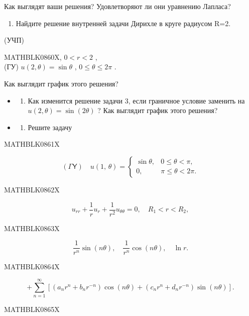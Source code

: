 \documentclass[
  ukrainian,
]{article}
\providecommand{\tightlist}{%
  \setlength{\itemsep}{0pt}\setlength{\parskip}{0pt}}
\begin{document}
Как выглядят ваши решения? Удовлетворяют ли они уравнению Лапласа?

\begin{enumerate}
\def\labelenumi{\arabic{enumi}.}
\setcounter{enumi}{2}
\tightlist
\item
  Найдите решение внутренней задачи Дирихле в круге радиусом R=2.
\end{enumerate}

(УЧП)

MATHBLK0860X, \(0 < r < 2\) ,\\
(ГУ) \(u(2, \theta) = \sin \theta\) , \(0 \le \theta \le 2\pi\) .

Как выглядит график этого решения?

\begin{itemize}
\tightlist
\item
  \begin{enumerate}
  \def\labelenumi{\arabic{enumi}.}
  \setcounter{enumi}{3}
  \tightlist
  \item
    Как изменится решение задачи 3, если граничное условие заменить на
    \(u(2, \theta) = \sin(2\theta)\) ? Как выглядит график этого
    решения?
  \end{enumerate}
\item
  \begin{enumerate}
  \def\labelenumi{\arabic{enumi}.}
  \setcounter{enumi}{4}
  \tightlist
  \item
    Решите задачу
  \end{enumerate}
\end{itemize}

MATHBLK0861X

\[
(\mathsf{\Gamma}\mathsf{Y}) \quad u(1, \, \theta) = \begin{cases} \sin \theta, & 0 \le \theta < \pi, \\ 0, & \pi \le \theta < 2\pi. \end{cases}
\]

MATHBLK0862X

\[
u_{rr} + \frac{1}{r} u_r + \frac{1}{r^2} u_{\theta\theta} = 0, \quad R_1 < r < R_2,
\]

MATHBLK0863X

\[
\frac{1}{r^n}\sin{(n\theta)}, \quad \frac{1}{r^n}\cos{(n\theta)}, \quad \ln r.
\]

MATHBLK0864X

\[
+\sum_{n=1}^{\infty} \left[ (a_n r^n + b_n r^{-n}) \cos(n\theta) + (c_n r^n + d_n r^{-n}) \sin(n\theta) \right].
\]

MATHBLK0865X
\end{document}
